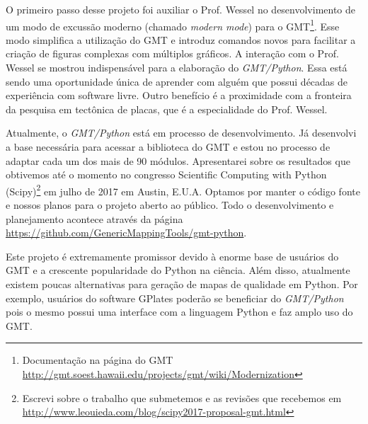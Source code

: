O primeiro passo desse projeto foi auxiliar o Prof. Wessel no desenvolvimento
de um modo de excussão moderno (chamado \textit{modern mode}) para o
GMT\footnote{Documentação na página do GMT
\url{http://gmt.soest.hawaii.edu/projects/gmt/wiki/Modernization}}.
Esse modo simplifica a utilização do GMT e introduz comandos novos para
facilitar a criação de figuras complexas com múltiplos gráficos.
A interação com o Prof. Wessel se mostrou indispensável para a elaboração do
\textit{GMT/Python}.
Essa está sendo uma oportunidade única de aprender com alguém que possui
décadas de experiência com software livre.
Outro benefício é a proximidade com a fronteira da pesquisa em tectônica de
placas, que é a especialidade do Prof. Wessel.

Atualmente, o \textit{GMT/Python} está em processo de desenvolvimento.
Já desenvolvi a base necessária para acessar a biblioteca do GMT
e estou no processo de adaptar cada um dos mais de 90 módulos.
Apresentarei sobre os resultados que obtivemos até o momento no congresso
Scientific Computing with Python (Scipy)\footnote{Escrevi sobre o trabalho que
submetemos e as revisões que recebemos em
\url{http://www.leouieda.com/blog/scipy2017-proposal-gmt.html}} em julho de 2017 em Austin, E.U.A.
Optamos por manter o código fonte e nossos planos para o projeto aberto ao
público.
Todo o desenvolvimento e planejamento acontece através da página
\url{https://github.com/GenericMappingTools/gmt-python}.

Este projeto é extremamente promissor devido à enorme base de usuários do GMT
e a crescente popularidade do Python na ciência.
Além disso, atualmente existem poucas alternativas para geração de mapas de
qualidade em Python.
Por exemplo, usuários do software GPlates \citep{gplates} poderão se beneficiar
do \textit{GMT/Python} pois o mesmo possui uma interface com a linguagem Python
e faz amplo uso do GMT.
